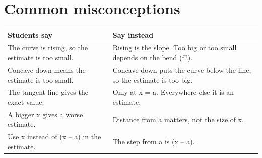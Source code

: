 \documentclass[11pt]{article}
\begin{document}
\section*{Common misconceptions}\begin{tabularx}{\textwidth}{@{}X X@{}}\toprule Students say & Say instead\\\midrule
The curve is rising, so the estimate is too small. & Rising is the slope. Too big or too small depends on the bend (f?).\\
Concave down means the estimate is too small. & Concave down puts the curve below the line, so the estimate is too big.\\
The tangent line gives the exact value. & Only at x = a. Everywhere else it is an estimate.\\
A bigger x gives a worse estimate. & Distance from a matters, not the size of x.\\
Use x instead of (x -- a) in the estimate. & The step from a is (x -- a).\\
\bottomrule\end{tabularx}
\end{document}
